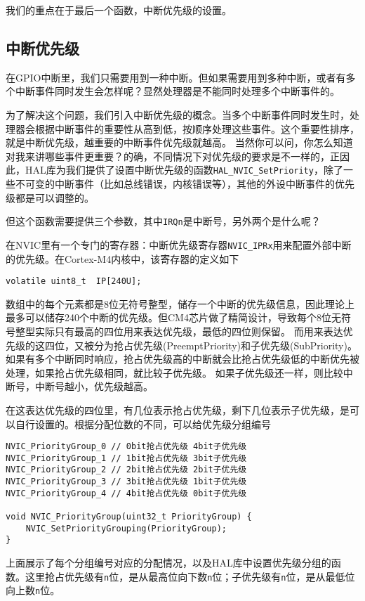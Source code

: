 我们的重点在于最后一个函数，中断优先级的设置。
\subsection{中断优先级}
在GPIO中断里，我们只需要用到一种中断。但如果需要用到多种中断，或者有多个中断事件同时发生会怎样呢？显然处理器是不能同时处理多个中断事件的。

为了解决这个问题，我们引入中断优先级的概念。当多个中断事件同时发生时，处理器会根据中断事件的重要性从高到低，按顺序处理这些事件。这个重要性排序，就是中断优先级，越重要的中断事件优先级就越高。
当然你可以问，你怎么知道对我来讲哪些事件更重要？的确，不同情况下对优先级的要求是不一样的，正因此，HAL库为我们提供了设置中断优先级的函数\verb|HAL_NVIC_SetPriority|，除了一些不可变的中断事件（比如总线错误，内核错误等），其他的外设中断事件的优先级都是可以调整的。

但这个函数需要提供三个参数，其中\verb|IRQn|是中断号，另外两个是什么呢？

在NVIC里有一个专门的寄存器：中断优先级寄存器\verb|NVIC_IPRx|用来配置外部中断的优先级。在Cortex-M4内核中，该寄存器的定义如下
\begin{lstlisting}
volatile uint8_t  IP[240U];
\end{lstlisting}
数组中的每个元素都是8位无符号整型，储存一个中断的优先级信息，因此理论上最多可以储存240个中断的优先级。但CM4芯片做了精简设计，导致每个8位无符号整型实际只有最高的四位用来表达优先级，最低的四位则保留。
而用来表达优先级的这四位，又被分为抢占优先级(PreemptPriority)和子优先级(SubPriority)。如果有多个中断同时响应，抢占优先级高的中断就会比抢占优先级低的中断优先被处理，如果抢占优先级相同，就比较子优先级。
如果子优先级还一样，则比较中断号，中断号越小，优先级越高。

在这表达优先级的四位里，有几位表示抢占优先级，剩下几位表示子优先级，是可以自行设置的。根据分配位数的不同，可以给优先级分组编号
\begin{lstlisting}
NVIC_PriorityGroup_0 // 0bit抢占优先级 4bit子优先级
NVIC_PriorityGroup_1 // 1bit抢占优先级 3bit子优先级
NVIC_PriorityGroup_2 // 2bit抢占优先级 2bit子优先级
NVIC_PriorityGroup_3 // 3bit抢占优先级 1bit子优先级
NVIC_PriorityGroup_4 // 4bit抢占优先级 0bit子优先级

void NVIC_PriorityGroup(uint32_t PriorityGroup) {
    NVIC_SetPriorityGrouping(PriorityGroup);
}
\end{lstlisting}
上面展示了每个分组编号对应的分配情况，以及HAL库中设置优先级分组的函数。这里抢占优先级有\verb|n|位，是从最高位向下数\verb|n|位；子优先级有\verb|n|位，是从最低位向上数\verb|n|位。

